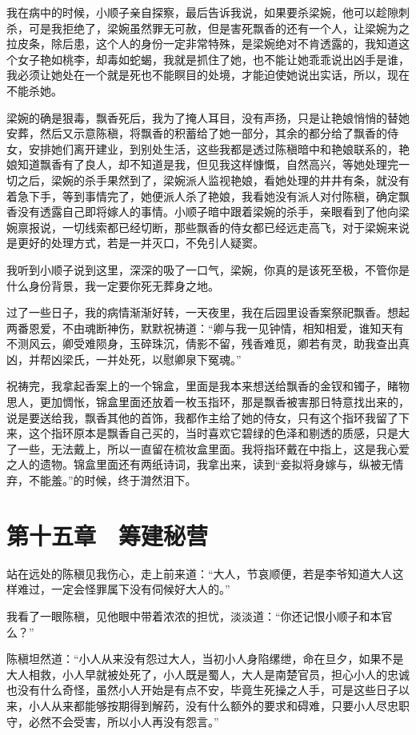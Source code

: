 我在病中的时候，小顺子亲自探察，最后告诉我说，如果要杀梁婉，他可以趁隙刺杀，可是我拒绝了，梁婉虽然罪无可赦，但是害死飘香的还有一个人，让梁婉为之拉皮条，除后患，这个人的身份一定非常特殊，是梁婉绝对不肯透露的，我知道这个女子艳如桃李，却毒如蛇蝎，我就是抓住了她，也不能让她乖乖说出凶手是谁，我必须让她处在一个就是死也不能瞑目的处境，才能迫使她说出实话，所以，现在不能杀她。

梁婉的确是狠毒，飘香死后，我为了掩人耳目，没有声扬，只是让艳娘悄悄的替她安葬，然后又示意陈稹，将飘香的积蓄给了她一部分，其余的都分给了飘香的侍女，安排她们离开建业，到别处生活，这些我都是透过陈稹暗中和艳娘联系的，艳娘知道飘香有了良人，却不知道是我，但见我这样慷慨，自然高兴，等她处理完一切之后，梁婉的杀手果然到了，梁婉派人监视艳娘，看她处理的井井有条，就没有着急下手，等到事情完了，她便派人杀了艳娘，我看她没有派人对付陈稹，确定飘香没有透露自己即将嫁人的事情。小顺子暗中跟着梁婉的杀手，亲眼看到了他向梁婉禀报说，一切线索都已经切断，那些飘香的侍女都已经远走高飞，对于梁婉来说是更好的处理方式，若是一并灭口，不免引人疑窦。

我听到小顺子说到这里，深深的吸了一口气，梁婉，你真的是该死至极，不管你是什么身份背景，我一定要你死无葬身之地。

过了一些日子，我的病情渐渐好转，一天夜里，我在后园里设香案祭祀飘香。想起两番恩爱，不由魂断神伤，默默祝祷道：“卿与我一见钟情，相知相爱，谁知天有不测风云，卿受难陨身，玉碎珠沉，倩影不留，残香难觅，卿若有灵，助我查出真凶，并帮凶梁氏，一并处死，以慰卿泉下冤魂。”

祝祷完，我拿起香案上的一个锦盒，里面是我本来想送给飘香的金钗和镯子，睹物思人，更加惆怅，锦盒里面还放着一枚玉指环，那是飘香被害那日特意找出来的，说是要送给我，飘香其他的首饰，我都作主给了她的侍女，只有这个指环我留了下来，这个指环原本是飘香自己买的，当时喜欢它碧绿的色泽和剔透的质感，只是大了一些，无法戴上，所以一直留在梳妆盒里面。我将指环戴在中指上，这是我心爱之人的遗物。锦盒里面还有两纸诗词，我拿出来，读到“妾拟将身嫁与，纵被无情弃，不能羞。”的时候，终于潸然泪下。

\chapter{第十五章　筹建秘营}

站在远处的陈稹见我伤心，走上前来道：“大人，节哀顺便，若是李爷知道大人这样难过，一定会怪罪属下没有伺候好大人的。”

我看了一眼陈稹，见他眼中带着浓浓的担忧，淡淡道：“你还记恨小顺子和本官么？”

陈稹坦然道：“小人从来没有怨过大人，当初小人身陷缧绁，命在旦夕，如果不是大人相救，小人早就被处死了，小人既是蜀人，大人是南楚官员，担心小人的忠诚也没有什么奇怪，虽然小人开始是有点不安，毕竟生死操之人手，可是这些日子以来，小人从来都能够按期得到解药，没有什么额外的要求和碍难，只要小人尽忠职守，必然不会受害，所以小人再没有怨言。”


